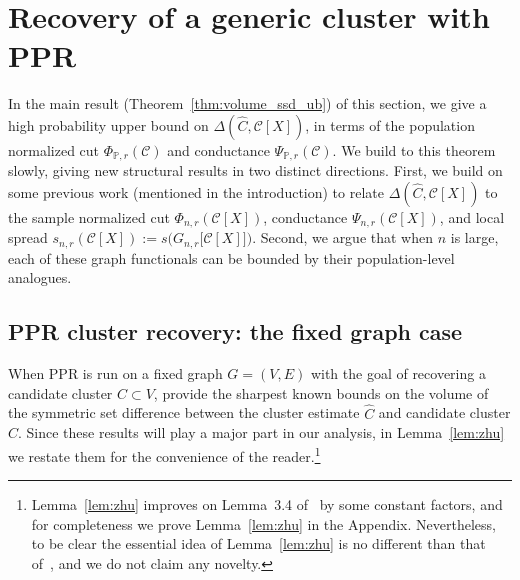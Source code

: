 \documentclass[11pt,twoside]{article}
\theoremstyle{definition}
\newcommand{\1}{\mathbf{1}}
\newcommand{\mc}[1]{\mathcal{#1}}
\newcommand{\Pbb}{\mathbb{P}}
\newcommand{\wh}[1]{\widehat{#1}}
\begin{document}
\section{Recovery of a generic cluster with PPR}
\label{sec:ub_symmetric_set_difference}

In the main result (Theorem~\ref{thm:volume_ssd_ub}) of this section, we give a high probability upper bound on $\Delta(\wh{C}, \mc{C}[X])$, in terms of the population normalized cut $\Phi_{\Pbb,r}(\mc{C})$ and conductance $\Psi_{\Pbb,r}(\mc{C})$. We build to this theorem slowly, giving new structural results in two distinct directions. First, we build on some previous work (mentioned in the introduction) to relate $\Delta(\wh{C}, \mc{C}[X])$ to the sample normalized cut $\Phi_{n,r}(\mc{C}[X])$, conductance $\Psi_{n,r}(\mc{C}[X])$, and local spread $s_{n,r}(\mc{C}[X]) := s\bigl(G_{n,r}\bigl[\mc{C}[X]\bigr]\bigr)$. Second, we argue that when $n$ is large, each of these graph functionals can be bounded by their population-level analogues.

\subsection{PPR cluster recovery: the fixed graph case}
\label{subsec:ppr_cluster_recovery_fixed_graph}
When PPR is run on a fixed graph $G = (V,E)$ with the goal of recovering a candidate cluster $C \subset V$, \cite{zhu2013} provide the sharpest known bounds on the volume of the symmetric set difference between the cluster estimate $\wh{C}$ and candidate cluster $C$. Since these results will play a major part in our analysis, in Lemma~\ref{lem:zhu} we restate them for the convenience of the reader.\footnote{Lemma~\ref{lem:zhu} improves on Lemma~3.4 of~\cite{zhu2013} by some constant factors, and for completeness we prove Lemma~\ref{lem:zhu} in the Appendix. Nevertheless, to be clear the essential idea of Lemma~\ref{lem:zhu} is no different than that of~\cite{zhu2013}, and we do not claim any novelty.}
\end{document}
